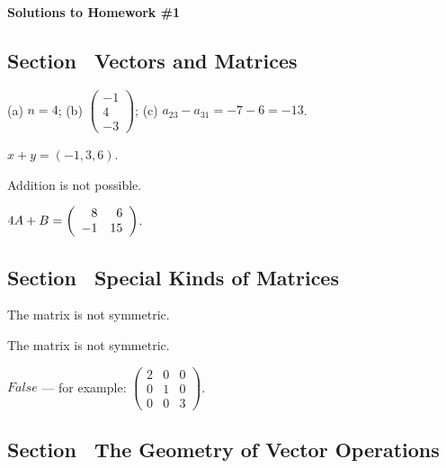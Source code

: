 


\vspace{0.1in}

\begin{center}
{\bf \Large Solutions to Homework \#1}
\end{center}

\subsection*{Section~\protect{\ref{S:1.1}} Vectors and Matrices}

(a) $n = 4$;
(b) $\left(\begin{array}{r} -1 \\ 4 \\ -3 \end{array} \right)$;
(c) $a_{23}-a_{31} =  -7 - 6 = -13$.


 $x + y = (-1,3,6)$.


 Addition is not possible.


 $4A + B = \left(\begin{array}{rr} 8 & 6\\ -1 &15\end{array}\right)$.

\vspace{0.1in}

\subsection*{Section~\protect{\ref{S:1.3}} Special Kinds of Matrices}


 The matrix is not symmetric.


 The matrix is not symmetric.


 $False$ --- for example:
$\left(\begin{array}{ccc}
2 & 0 & 0 \\
0 & 1 & 0 \\
0 & 0 & 3 \end{array}\right)$.

\newpage

\vspace{0.1in}


\subsection*{Section~\protect{\ref{S:1.4}} The Geometry of Vector Operations}



